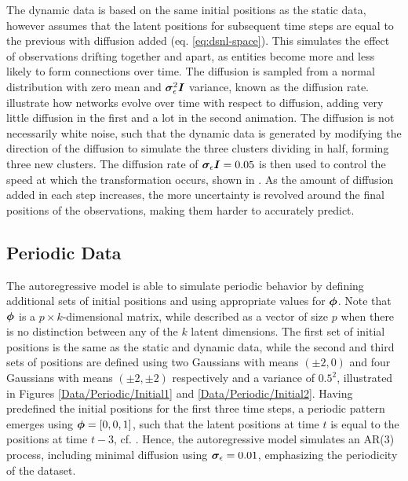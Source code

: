     The dynamic data is based on the same initial positions as the static data, however assumes that the latent positions for subsequent time steps are equal to the previous with diffusion added (eq. \ref{eq:dsnl-space}). This simulates the effect of observations drifting together and apart, as entities become more and less likely to form connections over time. The diffusion is sampled from a normal distribution with zero mean and $\bm{\sigma}_\epsilon^2\bm{I}$ variance, known as the diffusion rate.  illustrate how networks evolve over time with respect to diffusion, adding very little diffusion in the first and a lot in the second animation.
    The diffusion is not necessarily white noise, such that the dynamic data is generated by modifying the direction of the diffusion to simulate the three clusters dividing in half, forming three new clusters. The diffusion rate of $\bm{\sigma}_\epsilon\bm{I}=0.05$ is then used to control the speed at which the transformation occurs, shown in . 
    As the amount of diffusion added in each step increases, the more uncertainty is revolved around the final positions of the observations, making them harder to accurately predict.

\subsection{Periodic Data}

    The autoregressive model is able to simulate periodic behavior by defining additional sets of initial positions and using appropriate values for $\bm{\phi}$. Note that $\bm{\phi}$ is a $p\times k$-dimensional matrix, while described as a vector of size $p$ when there is no distinction between any of the $k$ latent dimensions.
    The first set of initial positions is the same as the static and dynamic data, while the second and third sets of positions are defined using two Gaussians with means $(\pm2,0)$ and four Gaussians with means $(\pm2,\pm2)$ respectively and a variance of $0.5^2$, illustrated in Figures \ref{Data/Periodic/Initial1} and \ref{Data/Periodic/Initial2}.
    Having predefined the initial positions for the first three time steps, a periodic pattern emerges using $\bm{\phi}=[0, 0, 1]$, such that the latent positions at time $t$ is equal to the positions at time $t-3$, cf. .
    Hence, the autoregressive model simulates an AR(3) process, including minimal diffusion using $\bm{\sigma}_\epsilon=0.01$, emphasizing the periodicity of the dataset.
    
